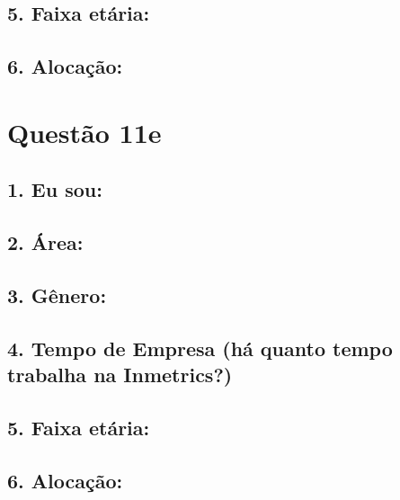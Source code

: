 \documentclass[]{book}
\begin{document}
\hypertarget{faixa-etaria-15}{%
\subsection{5. Faixa etária:}\label{faixa-etaria-15}}

\hypertarget{alocacao-15}{%
\subsection{6. Alocação:}\label{alocacao-15}}

\hypertarget{questao-11e}{%
\section{Questão 11e}\label{questao-11e}}

\hypertarget{eu-sou-16}{%
\subsection{1. Eu sou:}\label{eu-sou-16}}

\hypertarget{area-16}{%
\subsection{2. Área:}\label{area-16}}

\hypertarget{genero-16}{%
\subsection{3. Gênero:}\label{genero-16}}

\hypertarget{tempo-de-empresa-ha-quanto-tempo-trabalha-na-inmetrics-16}{%
\subsection{4. Tempo de Empresa (há quanto tempo trabalha na Inmetrics?)}\label{tempo-de-empresa-ha-quanto-tempo-trabalha-na-inmetrics-16}}

\hypertarget{faixa-etaria-16}{%
\subsection{5. Faixa etária:}\label{faixa-etaria-16}}

\hypertarget{alocacao-16}{%
\subsection{6. Alocação:}\label{alocacao-16}}
\end{document}
